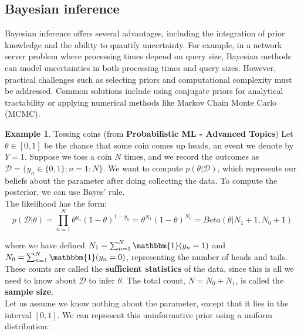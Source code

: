 \documentclass[12pt, a4paper]{article}
\theoremstyle{definition}
\newtheorem{example}{Example}[section]
\numberwithin{figure}{section}
\numberwithin{equation}{section}
\numberwithin{table}{section}
\begin{document}
\subsection{Bayesian inference}
Bayesian inference offers several advantages, including the integration of prior knowledge and the ability to quantify uncertainty. For example, in a network server problem where processing times depend on query size, Bayesian methods can model uncertainties in both processing times and query sizes. However, practical challenges such as selecting priors and computational complexity must be addressed. Common solutions include using conjugate priors for analytical tractability or applying numerical methods like Markov Chain Monte Carlo (MCMC).

\begin{example}{Tossing coins (from \textbf{Probabilistic ML - Advanced Topics})}
Let $\theta \in [0,1]$ be the chance that some coin comes up heads, an event we denote by $Y = 1$. Suppose we toss a coin $N$ times, and we record the outcomes as $\mathcal{D} = \{y_n \in \{0, 1\} : n = 1 : N \}$. We want to compute $p(\theta|\mathcal{D})$, which represents our beliefs about the parameter after doing collecting the data. To compute the posterior, we can use Bayes’ rule.\\

The likelihood has the form:
\begin{equation}
    p(\mathcal{D}|\theta) = \prod_{n=1}^{N} \theta^{y_n} (1 - \theta)^{1 - y_n} = \theta^{N_1} (1 - \theta)^{N_0}=Beta(\theta|N_1+1, N_0+1)
\end{equation}

where we have defined $N_1 = \sum_{n=1}^{N} \mathbbm{1} (y_n = 1)$ and $N_0 = \sum_{n=1}^{N} \mathbbm{1} (y_n = 0)$, representing the number of heads and tails. These counts are called the \textbf{sufficient statistics} of the data, since this is all we need to know about $\mathcal{D}$ to infer $\theta$. The total count, $N = N_0 + N_1$, is called the \textbf{sample size}.\\

Let us assume we know nothing about the parameter, except that it lies in the interval $[0, 1]$. We can represent this uninformative prior using a uniform distribution:


\end{example}
\end{document}
